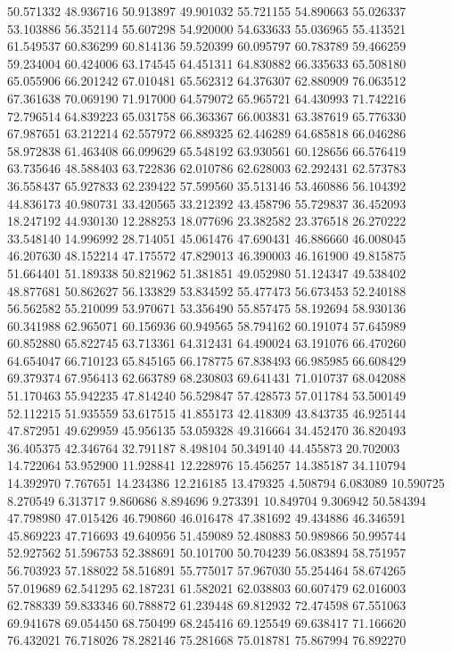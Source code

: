 50.571332
48.936716
50.913897
49.901032
55.721155
54.890663
55.026337
53.103886
56.352114
55.607298
54.920000
54.633633
55.036965
55.413521
61.549537
60.836299
60.814136
59.520399
60.095797
60.783789
59.466259
59.234004
60.424006
63.174545
64.451311
64.830882
66.335633
65.508180
65.055906
66.201242
67.010481
65.562312
64.376307
62.880909
76.063512
67.361638
70.069190
71.917000
64.579072
65.965721
64.430993
71.742216
72.796514
64.839223
65.031758
66.363367
66.003831
63.387619
65.776330
67.987651
63.212214
62.557972
66.889325
62.446289
64.685818
66.046286
58.972838
61.463408
66.099629
65.548192
63.930561
60.128656
66.576419
63.735646
48.588403
63.722836
62.010786
62.628003
62.292431
62.573783
36.558437
65.927833
62.239422
57.599560
35.513146
53.460886
56.104392
44.836173
40.980731
33.420565
33.212392
43.458796
55.729837
36.452093
18.247192
44.930130
12.288253
18.077696
23.382582
23.376518
26.270222
33.548140
14.996992
28.714051
45.061476
47.690431
46.886660
46.008045
46.207630
48.152214
47.175572
47.829013
46.390003
46.161900
49.815875
51.664401
51.189338
50.821962
51.381851
49.052980
51.124347
49.538402
48.877681
50.862627
56.133829
53.834592
55.477473
56.673453
52.240188
56.562582
55.210099
53.970671
53.356490
55.857475
58.192694
58.930136
60.341988
62.965071
60.156936
60.949565
58.794162
60.191074
57.645989
60.852880
65.822745
63.713361
64.312431
64.490024
63.191076
66.470260
64.654047
66.710123
65.845165
66.178775
67.838493
66.985985
66.608429
69.379374
67.956413
62.663789
68.230803
69.641431
71.010737
68.042088
51.170463
55.942235
47.814240
56.529847
57.428573
57.011784
53.500149
52.112215
51.935559
53.617515
41.855173
42.418309
43.843735
46.925144
47.872951
49.629959
45.956135
53.059328
49.316664
34.452470
36.820493
36.405375
42.346764
32.791187
8.498104
50.349140
44.455873
20.702003
14.722064
53.952900
11.928841
12.228976
15.456257
14.385187
34.110794
14.392970
7.767651
14.234386
12.216185
13.479325
4.508794
6.083089
10.590725
8.270549
6.313717
9.860686
8.894696
9.273391
10.849704
9.306942
50.584394
47.798980
47.015426
46.790860
46.016478
47.381692
49.434886
46.346591
45.869223
47.716693
49.640956
51.459089
52.480883
50.989866
50.995744
52.927562
51.596753
52.388691
50.101700
50.704239
56.083894
58.751957
56.703923
57.188022
58.516891
55.775017
57.967030
55.254464
58.674265
57.019689
62.541295
62.187231
61.582021
62.038803
60.607479
62.016003
62.788339
59.833346
60.788872
61.239448
69.812932
72.474598
67.551063
69.941678
69.054450
68.750499
68.245416
69.125549
69.638417
71.166620
76.432021
76.718026
78.282146
75.281668
75.018781
75.867994
76.892270
